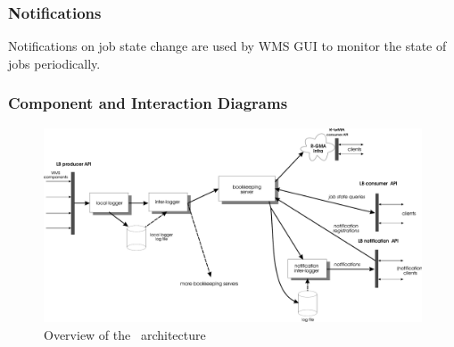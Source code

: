\subsubsection{Notifications}

Notifications on job state change are used by WMS GUI 
to monitor the state of jobs periodically.

\subsubsection{Component and Interaction Diagrams}

\begin{figure}[h]
\centering
\includegraphics[width=.8\hsize]{logging-arch-notif}
\caption{Overview of the \LB\ architecture}
\label{fig-arch}
\end{figure}


\endinput

